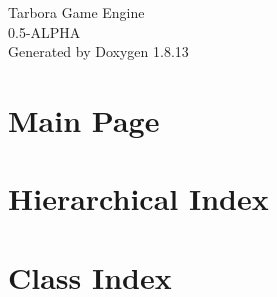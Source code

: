 \documentclass[twoside]{book}
\newcommand{\+}{\discretionary{\mbox{\scriptsize$\hookleftarrow$}}{}{}}
\newcommand{\clearemptydoublepage}{%
  \newpage{\pagestyle{empty}\cleardoublepage}%
}
\begin{document}
\hypersetup{pageanchor=false,
             bookmarksnumbered=true,
             pdfencoding=unicode
            }
\begin{titlepage}
\vspace*{7cm}
\begin{center}%
{\Large Tarbora Game Engine \\[1ex]\large 0.\+5-\/\+A\+L\+P\+HA }\\
\vspace*{1cm}
{\large Generated by Doxygen 1.8.13}\\
\end{center}
\end{titlepage}
\clearemptydoublepage
{}
\tableofcontents
\clearemptydoublepage
{}
\hypersetup{pageanchor=true}

\chapter{Main Page}
\label{index}\hypertarget{index}{}
\chapter{Hierarchical Index}

\chapter{Class Index}

\end{document}
